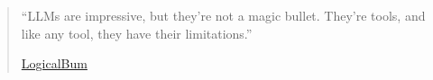 \vspace{40pt}

\begin{quote}
    ``LLMs are impressive, but they're not a magic bullet. They're tools, and like any tool, they have their limitations.''

    \hfill \href{https://www.reddit.com/r/learnprogramming/comments/1f3vo44/llm_are_just_tools/?utm_source=share&utm_medium=web3x&utm_name=web3xcss&utm_term=1&utm_content=share_button}{LogicalBum}
\end{quote}

